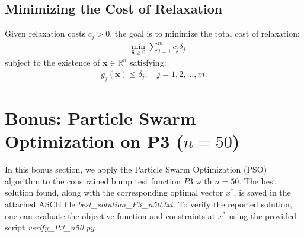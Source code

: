\documentclass[12pt]{article}
\begin{document}
\subsection{Minimizing the Cost of Relaxation}
Given relaxation costs $c_j > 0$, the goal is to minimize the total cost of relaxation:
\begin{align*}
    &\min_{\boldsymbol{\delta} \geq 0} \sum_{j=1}^{m} c_j \delta_j 
\end{align*}
subject to the existence of $\mathbf{x} \in \mathbb{R}^n$ satisfying:
\begin{align*}
    g_j(\mathbf{x}) \leq \delta_j, \quad j = 1,2,\dots,m.
\end{align*}

\section{Bonus: Particle Swarm Optimization on P3 ($n=50$)}

In this bonus section, we apply the Particle Swarm Optimization (PSO) algorithm to the constrained bump test function \( P3 \) with \( n = 50 \). The best solution found, along with the corresponding optimal vector \( x^* \), is saved in the attached ASCII file \textit{best\_solution\_P3\_n50.txt}. To verify the reported solution, one can evaluate the objective function and constraints at \( x^* \) using the provided script \textit{verify\_P3\_n50.py}.
\end{document}
